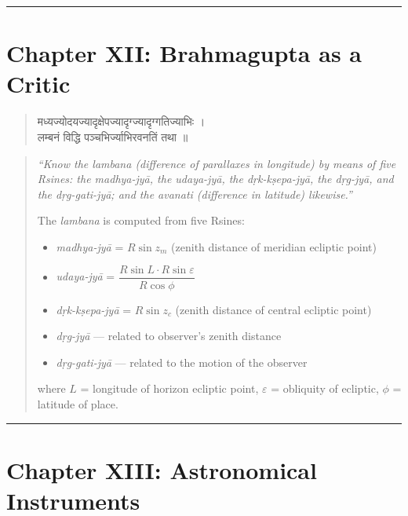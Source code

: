 \documentclass[11pt,a4paper]{article}
\newcommand{\longline}{\noindent\rule{\textwidth}{0.4pt}}
\newcommand{\dev}[1]{{\devanagarifont #1}}
\theoremstyle{definition}
\begin{document}
\longline

\section{Chapter XII: Brahmagupta as a Critic}
\label{sec:critic}



\noindent
\begin{quote}
\dev{मध्यज्योदयज्यादृक्षेपज्यादृग्ज्यादृग्गतिज्याभिः ।\\
लम्बनं विद्धि पञ्चभिर्ज्याभिरवनतिं तथा ॥}
\end{quote}

\hfill\noindent
\begin{quote}
\textit{``Know the lambana (difference of parallaxes in longitude) by means of five Rsines: the madhya-jy\=a, the udaya-jy\=a, the d\d{r}k-k\d{s}epa-jy\=a, the d\d{r}g-jy\=a, and the d\d{r}g-gati-jy\=a; and the avanati (difference in latitude) likewise.''}

The \textit{lambana} is computed from five Rsines:
\begin{itemize}
  \item \textit{madhya-jy\=a} = $R\sin z_m$ (zenith distance of meridian ecliptic point)
  \item \textit{udaya-jy\=a} = $\dfrac{R\sin L \cdot R\sin\varepsilon}{R\cos\phi}$
  \item \textit{d\d{r}k-k\d{s}epa-jy\=a} = $R\sin z_c$ (zenith distance of central ecliptic point)
  \item \textit{d\d{r}g-jy\=a} --- related to observer's zenith distance
  \item \textit{d\d{r}g-gati-jy\=a} --- related to the motion of the observer
\end{itemize}
where $L$ = longitude of horizon ecliptic point, $\varepsilon$ = obliquity of ecliptic, $\phi$ = latitude of place.
\end{quote}



\longline

\section{Chapter XIII: Astronomical Instruments}
\label{sec:instruments}
\end{document}
